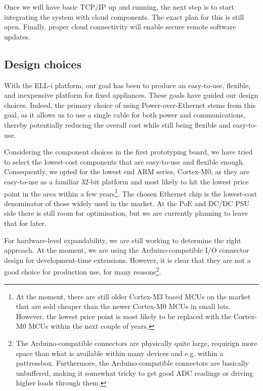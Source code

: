 \documentclass[final]{siamltex}
\begin{document}
Once we will have basic TCP/IP up and running, the next step is to
start integrating the system with cloud components.  The exact plan
for this is still open.  Finally, proper cloud connectivity will
enable secure remote software updates.

\subsection{Design choices}


With the ELL-i platform, our goal has been to produce an easy-to-use,
flexible, and inexpensive platform for fixed appliances.  These goals
have guided our design choices.  Indeed, the primary choice of using
Power-over-Ethernet stems from this goal, as it allows us to use a
single cable for both power and communications, thereby potentially
reducing the overall cost while still being flexible and easy-to-use.

Considering the component choices in the first prototyping board, we
have tried to select the lowest-cost components that are easy-to-use
and flexible enough.  Consequently, we opted for the lowest end ARM
series, Cortex-M0, as they are easy-to-use as a familiar 32-bit
platform and most likely to hit the lowest price point in the area
within a few years\footnote{At the moment, there are still older
  Cortex-M3 based MCUs on the market that are sold cheaper than the
  newer Cortex-M0 MCUs in small lots.  However, the lowest price
  point is most likely to be replaced with the Cortex-M0 MCUs within
  the next couple of years.}.
The chosen Ethernet chip is the lowest-cost denominator of those
widely used in the market.  At the PoE and DC/DC PSU side there is
still room for optimisation, but we are currently planning to leave
that for later.

For hardware-level expandability, we are still working to determine
the right approach.  At the moment, we are using the Arduino-compatible I/O
connector design for development-time extensions.  However, it is
clear that they are not a good choice for production use, for many
reasons\footnote{The Arduino-compatible connectors are physically quite large,
  requirign more space than what is available within many devices and
  e.g. within a pattressbox.  Furthermore, the Arduino-compatible connectors are
  basically unbuffered, making it somewhat tricky to get good ADC
  readings or driving higher loads through them.}.
\end{document}
